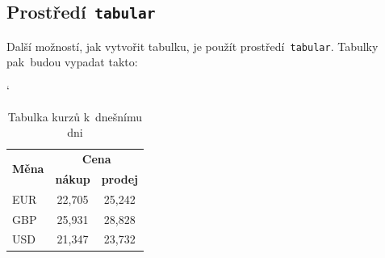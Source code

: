 \documentclass[a4paper, 11pt]{article}
\begin{document}
\subsection{Prostředí\texttt{ tabular}}

Další možností, jak vytvořit tabulku, je použít prostředí\texttt{ tabular}.
Tabulky pak~budou vypadat takto\footnotemark[1]:

\bigskip
\begin{table}[h!]
	\catcode`
	\centering
	\begin{tabular}{|l|c|c|}
		\hline
		\multirow{2}{*}{\textbf{Měna}} & \multicolumn{2}{c|}{\textbf{Cena}}                   \\ \cline{2-3}
		                               & \textbf{nákup}                     & \textbf{prodej} \\
		\hline
		EUR                            & 22,705                             & 25,242          \\
		GBP                            & 25,931                             & 28,828          \\
		USD                            & 21,347                             & 23,732          \\
		\hline
	\end{tabular}

	\caption{Tabulka kurzů k~dnešnímu dni}
	\label{tab:kurz}

\end{table}
\end{document}
